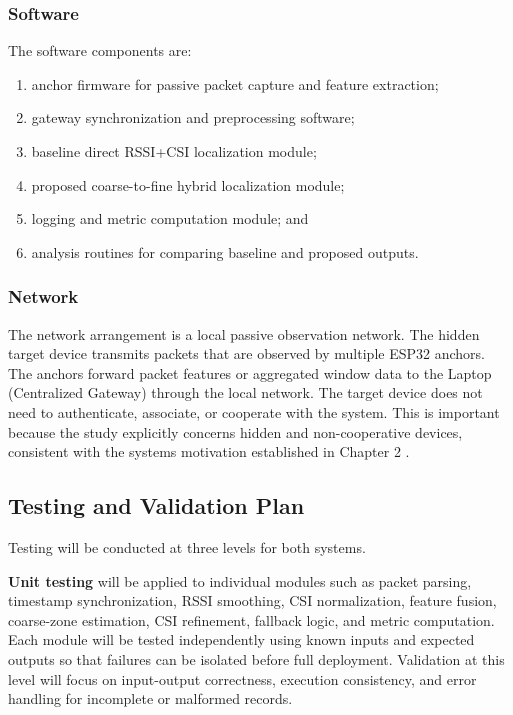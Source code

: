 \subsubsection{Software}

The software components are:

\begin{enumerate}
    \item anchor firmware for passive packet capture and feature extraction;
    \item gateway synchronization and preprocessing software;
    \item baseline direct RSSI+CSI localization module;
    \item proposed coarse-to-fine hybrid localization module;
    \item logging and metric computation module; and
    \item analysis routines for comparing baseline and proposed outputs.
\end{enumerate}

\subsubsection{Network}

The network arrangement is a local passive observation network. The hidden target device transmits packets that are observed by multiple ESP32 anchors. The anchors forward packet features or aggregated window data to the Laptop (Centralized Gateway) through the local network. The target device does not need to authenticate, associate, or cooperate with the system. This is important because the study explicitly concerns hidden and non-cooperative devices, consistent with the systems motivation established in Chapter 2 \cite{ju2025hidden}.

\subsection{Testing and Validation Plan}

Testing will be conducted at three levels for both systems.

\textbf{Unit testing} will be applied to individual modules such as packet parsing, timestamp synchronization, RSSI smoothing, CSI normalization, feature fusion, coarse-zone estimation, CSI refinement, fallback logic, and metric computation. Each module will be tested independently using known inputs and expected outputs so that failures can be isolated before full deployment. Validation at this level will focus on input-output correctness, execution consistency, and error handling for incomplete or malformed records.

